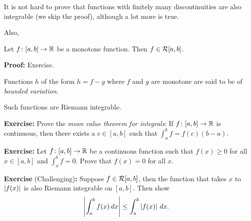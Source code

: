 \documentclass[10pt,aspectratio=169]{beamer}
\begin{document}
\begin{frame}

It is not hard to prove that functions with finitely many discontinuities
are also integrable (we skip the proof),
\pause
although a lot more is true.

\pause
\medskip

Also,

\begin{proposition}
Let $f \colon [a,b] \to {\mathbb{R}}$ be a monotone function.  Then $f \in {\mathcal{R}}[a,b]$.
\end{proposition}

\pause
\textbf{Proof:} Exercise.

\pause
\medskip

Functions $h$ of the form $h=f-g$ where $f$ and $g$ are monotone are said to
be of \emph{bounded variation}.

\pause
\medskip

Such functions are Riemann integrable.

\end{frame}

\begin{frame}

\textbf{Exercise:}
Prove the \emph{mean value theorem for integrals}:
If $f \colon [a,b] \to {\mathbb{R}}$ is continuous, then there exists
a $c \in [a,b]$ such that $\int_a^b f = f(c)(b-a)$.

\pause
\medskip

\textbf{Exercise:}
Let $f \colon [a,b] \to {\mathbb{R}}$ be a continuous function such that $f(x) \geq 0$
for all $x \in [a,b]$ and $\int_a^b f = 0$.  Prove that $f(x) = 0$
for all $x$.

\pause
\medskip

\textbf{Exercise} (Challenging)\textbf{:}
Suppose $f \in {\mathcal{R}}[a,b]$, then the function that takes $x$ to
$\left\lvert {f(x)} \right\rvert$ is also Riemann integrable on $[a,b]$.
\pause
Then show
\[
\left\lvert {\int_a^b f(x)\,dx} \right\rvert \leq \int_a^b \left\lvert {f(x)} \right\rvert\,dx .
\]

\end{frame}
\end{document}
